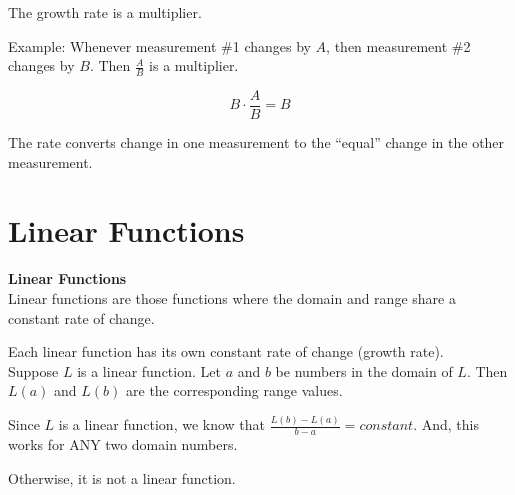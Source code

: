 \documentclass{ximera}
\begin{document}
\begin{idea}


The growth rate is a multiplier.


Example: Whenever measurement \#1 changes by $A$, then measurement \#2 changes by $B$.  Then $\frac{A}{B}$ is a multiplier.  

\[
B \cdot \frac{A}{B} = B
\]


The rate converts change in one measurement to the ``equal'' change in the other measurement.

\end{idea}





















\section*{Linear Functions}








\begin{definition} \textbf{\textcolor{green!50!black}{Linear Functions}} \\

Linear functions are those functions where the domain and range share a constant rate of change.  

\end{definition}


Each linear function has its own constant rate of change (growth rate). \\


Suppose $L$ is a linear function.  Let $a$ and $b$ be numbers in the domain of $L$.  Then $L(a)$ and $L(b)$ are the corresponding range values.

Since $L$ is a linear function, we know that $\frac{L(b) - L(a)}{b - a} = constant$.  And, this works for ANY two domain numbers.

Otherwise, it is not a linear function.
\end{document}
